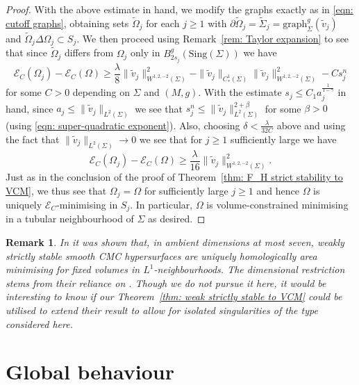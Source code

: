 \documentclass[12pt]{article}
\newtheorem{remark}{Remark}
\begin{document}
\begin{proof}
With the above estimate in hand, we modify the graphs exactly as in \eqref{eqn: cutoff graphs}, obtaining sets $\widetilde{\Omega}_j$ for each $j \geq 1$ with $\partial \widetilde{\Omega}_j = \widetilde{\Sigma}_j = \mathrm{graph}_\Sigma^g(\widetilde{v}_j)$ and $\widetilde{\Omega}_j \Delta \Omega_j \subset S_j$. We then proceed using Remark~\ref{rem: Taylor expansion} to see that since $\widetilde{\Omega}_j$ differs from $\Omega_j$ only in $B_{2s_j}^g(\mathrm{Sing}(\Sigma))$ we have
$$\mathcal{E}_C(\Omega_j) - \mathcal{E}_C(\Omega) \geq \frac{\lambda}{8}\|\widetilde{v}_j\|_{W^{1,2,-2}(\Sigma)}^2 - \|\widetilde{v}_j\|_{C^1_*(\Sigma)}\|\widetilde{v}_j\|_{W^{1,2,-2}(\Sigma)}^2 - Cs_j^n$$
for some $C > 0$ depending on $\Sigma$ and $(M,g)$. With the estimate $s_j \leq C_1a_j^{\frac{1}{1-\gamma}}$ in hand, since $a_j \leq \|\widetilde{v}_j\|_{L^2(\Sigma)}$ we see that $s_j^n \leq \|\widetilde{v}_j\|_{L^2(\Sigma)}^{2 + \beta}$ for some $\beta > 0$ (using \eqref{eqn: super-quadratic exponent}). Also, choosing $\delta < \frac{\lambda}{32C}$ above and using the fact that $\|\widetilde{v}_j\|_{L^2(\Sigma)} \rightarrow 0$ we see that for $j \geq 1$ sufficiently large we have
$$\mathcal{E}_C(\Omega_j) - \mathcal{E}_C(\Omega) \geq \frac{\lambda}{16}\|\widetilde{v}_j\|_{W^{1,2,-2}(\Sigma)}^2.$$
Just as in the conclusion of the proof of Theorem~\ref{thm: F_H strict stability to VCM}, we thus see that $\Omega_j = \Omega$ for sufficiently large $j \geq 1$ and hence $\Omega$ is uniquely $\mathcal{E}_C$-minimising in $S_j$. In particular, $\Omega$ is volume-constrained minimising in a tubular neighbourhood of $\Sigma$ as desired.
\end{proof}


\begin{remark}
    In \cite{MR10} it was shown that, in ambient dimensions at most seven, weakly strictly stable smooth CMC hypersurfaces are uniquely homologically area minimising for fixed volumes in $L^1$-neighbourhoods. The dimensional restriction stems from their reliance on \cite[Proposition 1]{MR10}. Though we do not pursue it here, it would be interesting to know if our Theorem~\ref{thm: weak strictly stable to VCM} could be utilised to extend their result to allow for isolated singularities of the type considered here.
\end{remark}


\section{Global behaviour}\label{sec: global behaviour}
\end{document}
